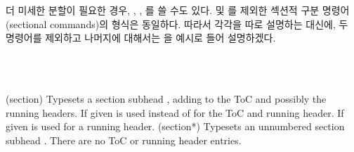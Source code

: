 더 미세한 분할이 필요한 경우, \cmd{\subsubsection}, \cmd{\paragraph}, \cmd{\subparagraph}를 쓸 수도 있다.
\cmd{\book}  및 \cmd{\part}를 제외한 섹션적 구분 명령어(sectional commands)의 형식은 동일하다.
따라서 각각을 따로 설명하는 대신에, 두 명령어를 제외하고 나머지에 대해서는 \cmd{\section}을 예시로 들어 설명하겠다.

\begin{syntax}
\cmd{\section}\\
\cmd{\section*}\\
\end{syntax}
\glossary(section)%
  {}%
  {Typesets a section subhead , adding  to the ToC and
   possibly the running headers. If given 
   is used instead of  for the ToC and running header. If given
    is used for a running header.}
\glossary(section*)%
  {}%
  {Typesets an unnumbered section subhead . There are no ToC or
   running header entries.}

